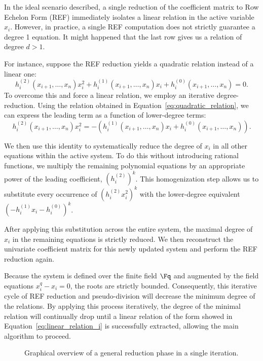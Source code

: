 In the ideal scenario described, a single reduction of the coefficient matrix to Row Echelon Form (REF) immediately isolates a linear relation in the active variable $x_i$. However, in practice, a single REF computation does not strictly guarantee a degree 1 equation. It might happened that the last row gives us a relation of degree $d > 1$.

For instance, suppose the REF reduction yields a quadratic relation instead of a linear one:
\begin{equation}
    h_i^{(2)}(x_{i+1}, \dots, x_n) x_i^2 + h_i^{(1)}(x_{i+1}, \dots, x_n) x_i + h_i^{(0)}(x_{i+1}, \dots, x_n) = 0.
    \label{eq:quadratic_relation}
\end{equation}
To overcome this and force a linear relation, we employ an iterative degree-reduction. Using the relation obtained in Equation~\ref{eq:quadratic_relation}, we can express the leading term as a function of lower-degree terms:
\begin{equation*}
    h_i^{(2)}(x_{i+1}, \dots, x_n) x_i^2 = -\left( h_i^{(1)}(x_{i+1}, \dots, x_n) x_i + h_i^{(0)}(x_{i+1}, \dots, x_n) \right).
\end{equation*}

We then use this identity to systematically reduce the degree of $x_i$ in all other equations within the active system. To do this without introducing rational functions, we multiply the remaining polynomial equations by an appropriate power of the leading coefficient, ${(h_i^{(2)})}^k$. This homogenization step allows us to substitute every occurrence of ${(h_i^{(2)} x_i^2)}^k$ with the lower-degree equivalent ${\left( -h_i^{(1)} x_i - h_i^{(0)} \right)}^k$.

After applying this substitution across the entire system, the maximal degree of $x_i$ in the remaining equations is strictly reduced. We then reconstruct the univariate coefficient matrix for this newly updated system and perform the REF reduction again. 

Because the system is defined over the finite field $\Fq$ and augmented by the field equations $x_i^q - x_i = 0$, the roots are strictly bounded. Consequently, this iterative cycle of REF reduction and pseudo-division will decrease the minimum degree of the relations. By applying this process iteratively, the degree of the minimal relation will continually drop until a linear relation of the form showed in Equation~\ref{eq:linear_relation_i} is successfully extracted, allowing the main algorithm to proceed.

\begin{figure}[h!]
    \centering
    \resizebox{0.9\linewidth}{!}{
        
    }
    \caption{Graphical overview of a general reduction phase in a single iteration.}\label{fig:iteration}
\end{figure}